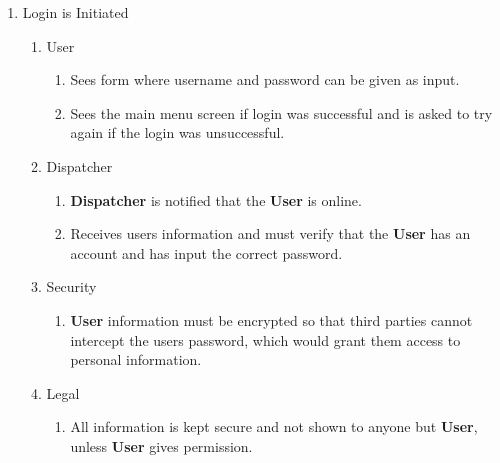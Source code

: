 \documentclass[english]{article}
\begin{document}
\begin{enumerate}[{BE}1.]
	\item Login is Initiated
	\begin{enumerate}[{VP3}.1]
		\item User
			\begin{enumerate}
				\item Sees form where username and password can be given as input.
				\item Sees the main menu screen if login was successful and is asked to try again if the login was unsuccessful.
			\end{enumerate}
		\item Dispatcher
			\begin{enumerate}
				\item \textbf{Dispatcher} is notified that the \textbf{User} is online.
				\item Receives users information and must verify that the \textbf{User} has an account and has input the correct password.
			\end{enumerate}
		\item Security
			\begin{enumerate}
				\item \textbf{User} information must be encrypted so that third parties cannot intercept the users password, which would grant them access to personal information.
			\end{enumerate}
		\item Legal
			\begin{enumerate}
				\item All information is kept secure and not shown to anyone but \textbf{User}, unless \textbf{User} gives permission.
			\end{enumerate}
	\end{enumerate}


\end{enumerate}
\end{document}
